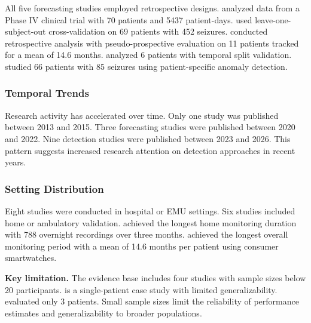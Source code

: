 All five forecasting studies employed retrospective designs. \textcite{vielufSeizureMonitoringCombined2025} analyzed data from a Phase IV clinical trial with 70 patients and 5437 patient-days. \textcite{meiselMachineLearningWristband2020} used leave-one-subject-out cross-validation on 69 patients with 452 seizures. \textcite{stirlingForecastingSeizureLikelihood2021} conducted retrospective analysis with pseudo-prospective evaluation on 11 patients tracked for a mean of 14.6 months. \textcite{nasseriAmbulatorySeizureForecasting2021} analyzed 6 patients with temporal split validation. \textcite{odeDevelopmentEpilepticSeizure2023} studied 66 patients with 85 seizures using patient-specific anomaly detection.

\subsubsection{Temporal Trends}

Research activity has accelerated over time. Only one study was published between 2013 and 2015. Three forecasting studies were published between 2020 and 2022. Nine detection studies were published between 2023 and 2026. This pattern suggests increased research attention on detection approaches in recent years.

\subsubsection{Setting Distribution}

Eight studies were conducted in hospital or EMU settings. Six studies included home or ambulatory validation. \textcite{dongTwoLayerEnsembleMethod2022} achieved the longest home monitoring duration with 788 overnight recordings over three months. \textcite{stirlingForecastingSeizureLikelihood2021} achieved the longest overall monitoring period with a mean of 14.6 months per patient using consumer smartwatches.

\textbf{Key limitation.} The evidence base includes four studies with sample sizes below 20 participants. \textcite{singhrathoreDevelopmentMultimodalMachine2024} is a single-patient case study with limited generalizability. \textcite{borujenyDetectionEpilepticSeizure2013} evaluated only 3 patients. Small sample sizes limit the reliability of performance estimates and generalizability to broader populations.

